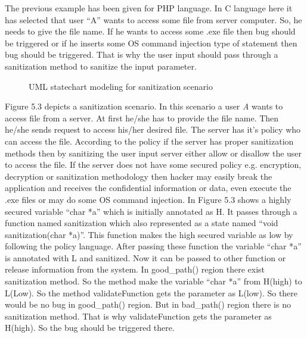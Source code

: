 The previous example has been given for PHP language. In C language here it has selected that user \enquote{A} wants to access some file from server computer. So, he needs to give the file name. If he wants to access some .exe file then bug should be triggered or if he inserts some OS command injection type of statement then bug should be triggered. That is why the user input should pass through a sanitization method to sanitize the input parameter.

\begin{figure}[htbp]
	\centering
	\label{fig:sanitization_scenario}
	\caption{UML statechart modeling for sanitization scenario}
\end{figure}

 Figure 5.3 depicts a sanitization scenario. In this scenario a user \emph{A} wants to access file from a server. At first he/she has to provide the file name. Then he/she sends request to access his/her desired file. The server has it's policy who can access the file. According to the policy if the server has proper sanitization methods then by sanitizing the user input server either allow or disallow the user to access the file. If the server does not have some secured policy e.g. encryption, decryption or sanitization methodology then hacker may easily break the application and receives the confidential information or data, even execute the .exe files or may do some OS command injection. In Figure 5.3 shows a highly secured variable \enquote{char *a} which is initially annotated as H. It passes through a function named sanitization which also represented as a state named \enquote{void sanitization(char *a)}. This function makes the high secured variable as low by following the policy language. After passing these function the variable \enquote{char *a} is annotated with L and sanitized. Now it can be passed to other function or release information from the system. In good\_path() region there exist sanitization method. So the method make the variable \enquote{char *a} from H(high) to L(Low). So the method validateFunction gets the parameter as L(low). So there would be no bug in good\_path() region. But in bad\_path() region there is no sanitization method. That is why validateFunction gets the parameter as H(high). So the bug should be triggered there.



